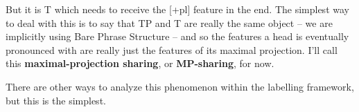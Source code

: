 But it is T which needs to receive the [+pl] feature in the end. The simplest way to deal with this is to say that TP and T are really the same object -- we are implicitly using Bare Phrase Structure -- and so the features a head is eventually pronounced with are really just the features of its maximal projection. I'll call this \textbf{maximal-projection sharing}, or \textbf{MP-sharing}, for now.

There are other ways to analyze this phenomenon within the labelling framework, but this is the simplest.
